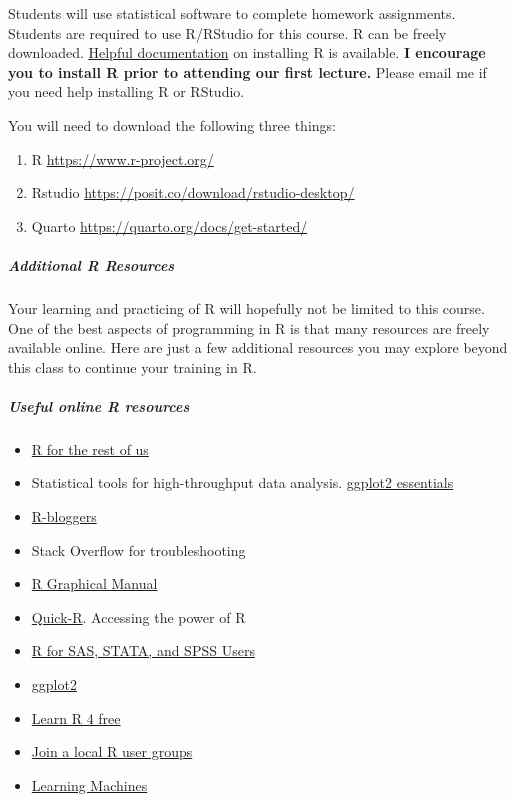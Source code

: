 \documentclass[
  letterpaper,
  DIV=11,
  numbers=noendperiod]{scrartcl}
\let\oldsubparagraph\subparagraph
\renewcommand{\subparagraph}[1]{\oldsubparagraph{#1}\mbox{}}
\begin{document}
Students will use statistical software to complete homework assignments.
Students are required to use R/RStudio for this course. R can be freely
downloaded.
\href{https://rstudio-education.github.io/hopr/starting.html}{Helpful
documentation} on installing R is available. \textbf{I encourage you to
install R prior to attending our first lecture.} Please email me if you
need help installing R or RStudio.

You will need to download the following three things:

\begin{enumerate}
\def\labelenumi{\arabic{enumi}.}
\item
  R \url{https://www.r-project.org/}
\item
  Rstudio \url{https://posit.co/download/rstudio-desktop/}
\item
  Quarto \url{https://quarto.org/docs/get-started/}
\end{enumerate}

\hypertarget{additional-r-resources}{%
\subparagraph{Additional R Resources}\label{additional-r-resources}}

Your learning and practicing of R will hopefully not be limited to this
course. One of the best aspects of programming in R is that many
resources are freely available online. Here are just a few additional
resources you may explore beyond this class to continue your training in
R.

\hypertarget{useful-online-r-resources}{%
\subparagraph{Useful online R
resources}\label{useful-online-r-resources}}

\begin{itemize}
\item
  \href{https://rfortherestofus.com/}{R for the rest of us}
\item
  Statistical tools for high-throughput data analysis.
  \href{http://www.sthda.com/english/wiki/ggplot2-essentials\#google_vignette}{ggplot2
  essentials}
\item
  \href{http://www.r-bloggers.com/}{R-bloggers}
\item
  Stack Overflow for troubleshooting
\item
  \href{https://www.imsbio.co.jp/RGM/R_image_list}{R Graphical Manual}
\item
  \href{http://www.statmethods.net/}{Quick-R}. Accessing the power of R
\item
  \href{http://r4stats.com/}{R for SAS, STATA, and SPSS Users}
\item
  \href{https://ggplot2.tidyverse.org/}{ggplot2}
\item
  \href{https://www.learnr4free.com/en/index.html}{Learn R 4 free}
\item
  \href{https://www.r-consortium.org/blog/2019/09/09/r-community-explorer-r-user-groups}{Join
  a local R user groups}
\item
  \href{https://blog.ephorie.de/learning-r-the-ultimate-introduction-incl-machine-learning}{Learning
  Machines}
\end{itemize}
\end{document}
